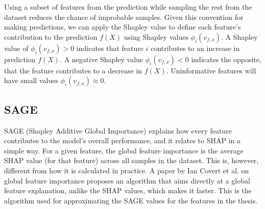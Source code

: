 Using a subset of features from the prediction while sampling the rest from the dataset reduces the chance of improbable samples.
Given this convention for making predictions, we can apply the Shapley value to define each feature's contribution to the prediction $f(X)$ using Shapley values $\phi_i(v_{f,x})$.
A Shapley value of $\phi_i(v_{f,x}) > 0$ indicates that feature $i$ contributes to an increase in prediction $f(X)$.
A negative Shapley value $\phi_i(v_{f,x}) < 0$ indicates the opposite, that the feature contributes to a decrease in $f(X)$.
Uninformative features will have small values $\phi_i(v_{f,x}) \approx 0$.

\subsection{SAGE}
SAGE (Shapley Additive Global Importance) explains how every feature contributes to the model's overall performance, and it relates to SHAP in a simple way.
For a given feature, the global feature importance is the average SHAP value (for that feature) across all samples in the dataset.
This is, however, different from how it is calculated in practice.
A paper by Ian Covert et al.
\cite{sage_paper} on global feature importance proposes an algorithm that aims directly at a global feature explanation, unlike the SHAP values, which makes
it faster.
This is the algorithm used for approximating the SAGE values for the features in the thesis.

